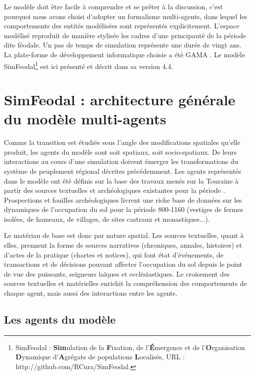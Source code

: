 \documentclass[12pt, a4paper, oneside]{book}
\begin{document}
	Le modèle doit être facile à comprendre et se prêter à la discussion, c'est pourquoi nous avons choisi d'adopter un formalisme multi-agents, dans lequel les comportements des entités modélisées sont représentés explicitement.
	L'espace modélisé reproduit de manière stylisée les cadres d'une principauté de la période dite féodale.
	Un pas de temps de simulation représente une durée de vingt ans.
	La plate-forme de développement informatique choisie a été GAMA \autocite{grignard_gama_2013}.
	Le modèle SimFeodal\footnote{
	SimFeodal : \textbf{Sim}ulation de la \textbf{F}ixation, de l’\textbf{É}mergence et de l’\textbf{O}rganisation \textbf{D}ynamique d’\textbf{A}grégats de populations \textbf{L}ocalisés, URL : http://github.com/RCura/SimFeodal.
	} est ici présenté et décrit dans sa version 4.4.
	
	\section[Architecture générale]{SimFeodal : architecture générale du modèle multi-agents}
	
	Comme la transition est étudiée sous l'angle des modifications spatiales qu'elle	produit, les agents du modèle sont soit spatiaux, soit socio-spatiaux.
	De leurs interactions au cours d'une simulation doivent émerger les transformations du système de peuplement régional décrites précédemment.
	Les agents représentés dans le modèle ont été définis sur la base des travaux menés sur la Touraine à partir des sources textuelles et archéologiques existantes pour la période \autocite{zadora-rio_paroisses_2008}.
	Prospections et fouilles archéologiques livrent une riche base de données sur les dynamiques de l'occupation du sol pour la période 800-1160 (vestiges de fermes isolées, de hameaux, de villages, de sites castraux et monastiques...). 
	
	Le matériau de base est donc par nature spatial.
	Les sources textuelles, quant à elles, prennent la forme de sources narratives (chroniques, annales, histoires) et d'actes de la pratique (chartes et notices), qui font état d'événements, de transactions et de décisions pouvant affecter l'occupation du sol depuis le point de vue des puissants, seigneurs laïques et ecclésiastiques.
	Le croisement des sources textuelles et matérielles enrichit la compréhension des comportements de chaque agent, mais aussi des interactions entre les agents.
	
	\subsection{Les agents du modèle}
	
\end{document}
